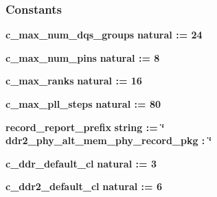 \subsubsection*{Constants}
 \begin{DoxyCompactItemize}
\item 
{\bf c\+\_\+max\+\_\+num\+\_\+dqs\+\_\+groups} {\bfseries \textcolor{comment}{natural}\textcolor{vhdlchar}{ }\textcolor{vhdlchar}{ }\textcolor{vhdlchar}{\+:}\textcolor{vhdlchar}{=}\textcolor{vhdlchar}{ }\textcolor{vhdlchar}{ } \textcolor{vhdldigit}{24} \textcolor{vhdlchar}{ }} 
\item 
{\bf c\+\_\+max\+\_\+num\+\_\+pins} {\bfseries \textcolor{comment}{natural}\textcolor{vhdlchar}{ }\textcolor{vhdlchar}{ }\textcolor{vhdlchar}{\+:}\textcolor{vhdlchar}{=}\textcolor{vhdlchar}{ }\textcolor{vhdlchar}{ } \textcolor{vhdldigit}{8} \textcolor{vhdlchar}{ }} 
\item 
{\bf c\+\_\+max\+\_\+ranks} {\bfseries \textcolor{comment}{natural}\textcolor{vhdlchar}{ }\textcolor{vhdlchar}{ }\textcolor{vhdlchar}{\+:}\textcolor{vhdlchar}{=}\textcolor{vhdlchar}{ }\textcolor{vhdlchar}{ } \textcolor{vhdldigit}{16} \textcolor{vhdlchar}{ }} 
\item 
{\bf c\+\_\+max\+\_\+pll\+\_\+steps} {\bfseries \textcolor{comment}{natural}\textcolor{vhdlchar}{ }\textcolor{vhdlchar}{ }\textcolor{vhdlchar}{\+:}\textcolor{vhdlchar}{=}\textcolor{vhdlchar}{ }\textcolor{vhdlchar}{ } \textcolor{vhdldigit}{80} \textcolor{vhdlchar}{ }} 
\item 
{\bf record\+\_\+report\+\_\+prefix} {\bfseries \textcolor{comment}{string}\textcolor{vhdlchar}{ }\textcolor{vhdlchar}{ }\textcolor{vhdlchar}{\+:}\textcolor{vhdlchar}{=}\textcolor{vhdlchar}{ }\textcolor{vhdlchar}{ }\textcolor{vhdlchar}{ }\textcolor{vhdlchar}{ }\textcolor{keyword}{\char`\"{} ddr2\+\_\+phy\+\_\+alt\+\_\+mem\+\_\+phy\+\_\+record\+\_\+pkg \+:  \char`\"{}}\textcolor{vhdlchar}{ }} 
\item 
{\bf c\+\_\+ddr\+\_\+default\+\_\+cl} {\bfseries \textcolor{comment}{natural}\textcolor{vhdlchar}{ }\textcolor{vhdlchar}{ }\textcolor{vhdlchar}{\+:}\textcolor{vhdlchar}{=}\textcolor{vhdlchar}{ }\textcolor{vhdlchar}{ } \textcolor{vhdldigit}{3} \textcolor{vhdlchar}{ }} 
\item 
{\bf c\+\_\+ddr2\+\_\+default\+\_\+cl} {\bfseries \textcolor{comment}{natural}\textcolor{vhdlchar}{ }\textcolor{vhdlchar}{ }\textcolor{vhdlchar}{\+:}\textcolor{vhdlchar}{=}\textcolor{vhdlchar}{ }\textcolor{vhdlchar}{ } \textcolor{vhdldigit}{6} \textcolor{vhdlchar}{ }} 
\item 

\end{DoxyCompactItemize}
